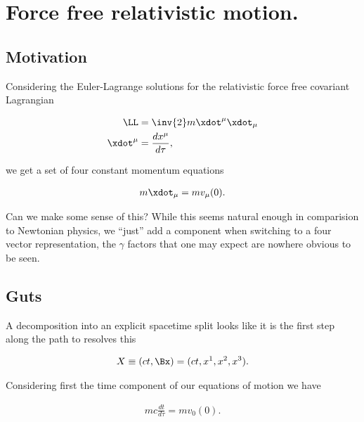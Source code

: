 

\chapter{Force free relativistic motion.}
\label{chap:constFourMomentum}
{}
\date{Nov 15, 2009}

\beginArtNoToc

\section{Motivation}

Considering the Euler-Lagrange solutions for the relativistic force free covariant Lagrangian

\begin{align}\label{eqn:constFourMomentum:qqq1}
\LL &= \inv{2} m \xdot^\mu \xdot_\mu \\
\xdot^\mu &= \frac{d x^\mu}{d \tau},
\end{align}

we get a set of four constant momentum equations

\begin{align}\label{eqn:constFourMomentum:qqq5}
m \xdot_\mu = m v_\mu(0).
\end{align}

Can we make some sense of this?  While this seems natural enough in comparision to Newtonian physics, we ``just'' add a component when switching to a four vector representation, the $\gamma$ factors that one may expect are nowhere obvious to be seen.  

\section{Guts}

A decomposition into an explicit spacetime split looks like it is the first step along the path to resolves this

\begin{align}\label{eqn:constFourMomentum:qqq6}
X \equiv (c t, \Bx) = (ct, x^1, x^2, x^3).
\end{align}

Considering first the time component of our equations of motion we have

\begin{align}\label{eqn:constFourMomentum:qqq7}
m c \frac{dt}{d\tau} = m v_0(0).
\end{align}

